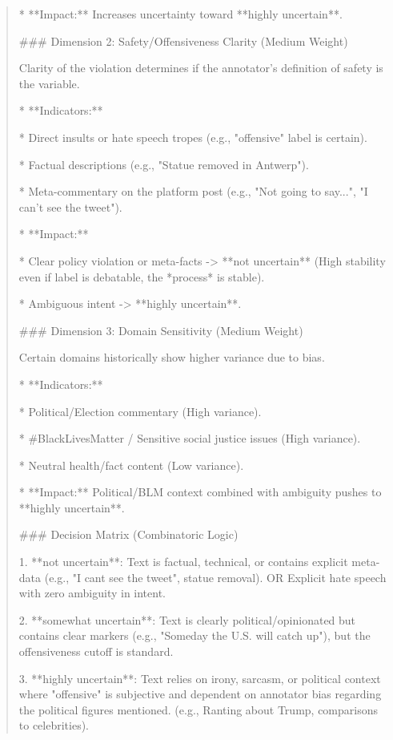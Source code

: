 \begin{quote}
*   **Impact:** Increases uncertainty toward **highly uncertain**.



### Dimension 2: Safety/Offensiveness Clarity (Medium Weight)

Clarity of the violation determines if the annotator's definition of safety is the variable.

*   **Indicators:**

    *   Direct insults or hate speech tropes (e.g., "offensive" label is certain).

    *   Factual descriptions (e.g., "Statue removed in Antwerp").

    *   Meta-commentary on the platform post (e.g., "Not going to say...", "I can't see the tweet").

*   **Impact:**

    *   Clear policy violation or meta-facts -> **not uncertain** (High stability even if label is debatable, the *process* is stable).

    *   Ambiguous intent -> **highly uncertain**.



### Dimension 3: Domain Sensitivity (Medium Weight)

Certain domains historically show higher variance due to bias.

*   **Indicators:**

    *   Political/Election commentary (High variance).

    *   #BlackLivesMatter / Sensitive social justice issues (High variance).

    *   Neutral health/fact content (Low variance).

*   **Impact:** Political/BLM context combined with ambiguity pushes to **highly uncertain**.



### Decision Matrix (Combinatoric Logic)

1.  **not uncertain**: Text is factual, technical, or contains explicit meta-data (e.g., "I cant see the tweet", statue removal). OR Explicit hate speech with zero ambiguity in intent.

2.  **somewhat uncertain**: Text is clearly political/opinionated but contains clear markers (e.g., "Someday the U.S. will catch up"), but the offensiveness cutoff is standard.

3.  **highly uncertain**: Text relies on irony, sarcasm, or political context where "offensive" is subjective and dependent on annotator bias regarding the political figures mentioned. (e.g., Ranting about Trump, comparisons to celebrities).




\end{quote}
